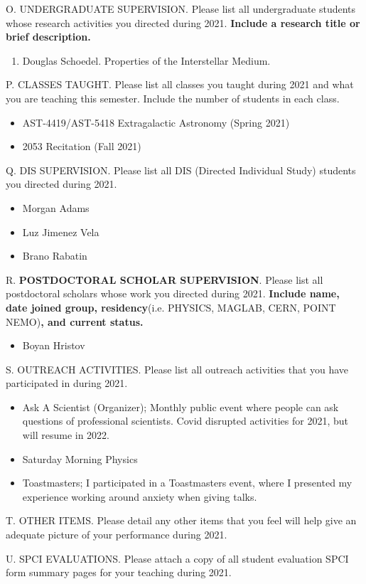 \noindent O. UNDERGRADUATE SUPERVISION. Please list all
undergraduate students whose research activities you directed during
2021.  {\bf Include a research title or brief description. }
\bigskip

\begin{enumerate}
    \item Douglas Schoedel.  Properties of the Interstellar Medium.
\end{enumerate}

\noindent P. CLASSES TAUGHT. Please list all classes you taught
during 2021 and what you are teaching this semester.  Include the
number of students in each class.
\bigskip


\begin{itemize}
	\item AST-4419/AST-5418 Extragalactic Astronomy (Spring 2021)
	\item 2053 Recitation (Fall 2021)
\end{itemize}

\noindent Q. DIS SUPERVISION. Please list all DIS (Directed
Individual Study) students you directed during 2021.
\bigskip

\begin{itemize}
    \item Morgan Adams
    \item Luz Jimenez Vela
    \item Brano Rabatin
\end{itemize}

\noindent R. {\bf POSTDOCTORAL SCHOLAR SUPERVISION}. Please list all postdoctoral scholars whose work you directed during 2021.  {\bf Include name, date joined group, residency}(i.e. PHYSICS, MAGLAB, CERN, POINT NEMO){\bf, and current status. }
\bigskip

\begin{itemize}
    \item Boyan Hristov
\end{itemize}


\noindent S. OUTREACH ACTIVITIES. Please list all outreach
activities that you have participated in during 2021.
\bigskip

\begin{itemize}
    \item Ask A Scientist (Organizer); Monthly public event where people can ask questions
        of professional scientists.  Covid disrupted activities for 2021, but
        will resume in 2022.
    \item Saturday Morning Physics
    \item Toastmasters; I participated in a Toastmasters event, where I
        presented my experience working around anxiety when giving talks.
\end{itemize}

\noindent T. OTHER ITEMS. Please detail any other items that you
feel will help give an adequate picture of your performance during
2021.
\bigskip

\noindent U.  SPCI EVALUATIONS. Please attach a copy of all student
evaluation SPCI form summary pages for your teaching during 2021.





 
